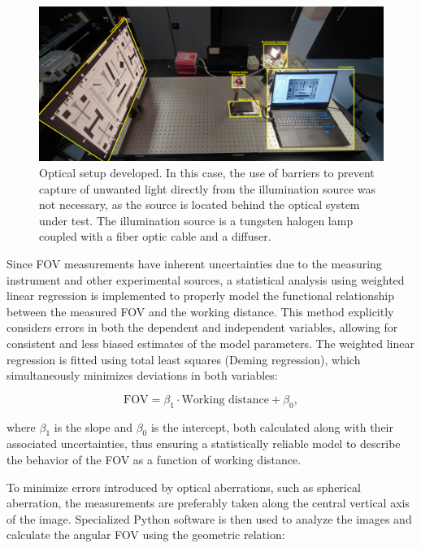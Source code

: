 \begin{figure}[H]
        \centering
        \includegraphics[width=0.8\linewidth]{Figures/C3/MTF_montaje.pdf}
        \caption{Optical setup developed. In this case, the use of barriers to prevent capture of unwanted light directly from the illumination source was not necessary, as the source is located behind the optical system under test. The illumination source is a tungsten halogen lamp coupled with a fiber optic cable and a diffuser.}
        \label{fig:MTF_FOV_montage}
\end{figure}

Since FOV measurements have inherent uncertainties due to the measuring instrument and other experimental sources, a statistical analysis using weighted linear regression is implemented to properly model the functional relationship between the measured FOV and the working distance. This method explicitly considers errors in both the dependent and independent variables, allowing for consistent and less biased estimates of the model parameters. The weighted linear regression is fitted using total least squares (Deming regression), which simultaneously minimizes deviations in both variables:

\begin{equation}
\text{FOV} = \beta_1 \cdot \text{Working distance} + \beta_0,
\label{eq:regresion_lineal}
\end{equation}

where \( \beta_1 \) is the slope and \( \beta_0 \) is the intercept, both calculated along with their associated uncertainties, thus ensuring a statistically reliable model to describe the behavior of the FOV as a function of working distance.

To minimize errors introduced by optical aberrations, such as spherical aberration, the measurements are preferably taken along the central vertical axis of the image. Specialized Python software is then used to analyze the images and calculate the angular FOV using the geometric relation:

